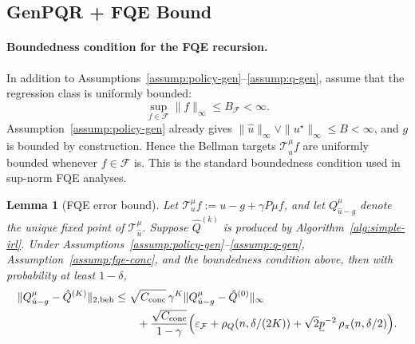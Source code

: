 \documentclass{article}
\newtheorem{lemma}{Lemma}
\newcommand{\1}{\mathbbm{1}}
\begin{document}
\subsection{GenPQR + FQE Bound}

\paragraph{Boundedness condition for the FQE recursion.}
In addition to Assumptions~\ref{assump:policy-gen}--\ref{assump:q-gen},
assume that the regression class is uniformly bounded:
\[
\sup_{f\in\mathcal F}\|f\|_\infty \le B_{\mathcal F}<\infty.
\]
Assumption~\ref{assump:policy-gen} already gives
\(\|\hat u\|_\infty \vee \|u^\star\|_\infty \le B < \infty\), and \(g\) is bounded by
construction. Hence the Bellman targets \(\mathcal T^\mu_{\hat u}f\) are
uniformly bounded whenever \(f\in\mathcal F\) is. This is the standard
boundedness condition used in sup-norm FQE analyses.

 



\begin{lemma}[FQE error bound]
\label{lem:fqe-bound}
Let \(\mathcal T^\mu_u f := u-g+\gamma P\mu f\), and let
\(Q^\mu_{\hat u-g}\) denote the unique fixed point of
\(\mathcal T^\mu_{\hat u}\). Suppose \(\hat Q^{(k)}\) is produced by
Algorithm~\ref{alg:simple-irl}. Under
Assumptions~\ref{assump:policy-gen}--\ref{assump:q-gen},
Assumption~\ref{assump:fqe-conc}, and the boundedness condition above, then  with probability at least
\(1-\delta\),
\begin{align*}
\|Q^\mu_{\hat u-g}-\hat Q^{(K)}\|_{2,\mathrm{beh}}
&\le
\sqrt{C_{\mathrm{conc}}}\,\gamma^K
\|Q^\mu_{\hat u-g}-\hat Q^{(0)}\|_{\infty}\\
&\qquad+
\frac{\sqrt{C_{\mathrm{conc}}}}{1-\gamma}
\Bigl(
\varepsilon_{\mathcal F}
+\rho_Q(n,\delta/(2K))
+ \sqrt{2}\underline p^{-2}\,\rho_\pi(n,\delta/2)
\Bigr).
\end{align*}
\end{lemma}
\end{document}
